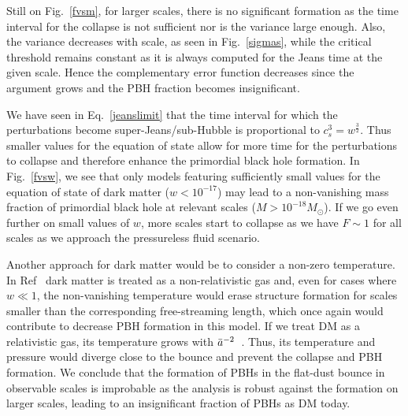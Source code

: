 \documentclass[a4paper,11pt]{article}
\begin{document}
Still on Fig.~\ref{fvsm}, for larger scales, there is no significant formation as the
time interval for the collapse is not sufficient nor is the variance large enough. Also,
the variance decreases with scale, as seen in Fig.~\ref{sigmas}, while the critical
threshold remains constant as it is always computed for the Jeans time at the given
scale. Hence the complementary error function decreases since the argument grows and the
PBH fraction becomes insignificant.

We have seen in Eq.~\eqref{jeanslimit} that the time interval for which the
perturbations become super-Jeans/sub-Hubble is proportional to $c_s^3 =
	w^{\frac{3}{2}}$. Thus smaller values for the equation of state allow for more time for
the perturbations to collapse and therefore enhance the primordial black hole formation.
In Fig.~\ref{fvsw}, we see that only models featuring sufficiently small values for the
equation of state of dark matter ($w < 10^{-17}$) may lead to a non-vanishing mass
fraction of primordial black hole at relevant scales ($M >  10^{-18}M_\odot$). If we go
even further on small values of $w$, more scales start to collapse as we have $F\sim 1$
for all scales as we approach the pressureless fluid scenario.

Another approach for dark matter would be to consider a non-zero temperature. In
Ref~\cite{Armendariz2014} dark matter is treated as a non-relativistic gas and, even for
cases where $w\ll1$, the non-vanishing temperature would erase structure formation for
scales smaller than the corresponding free-streaming length, which once again would
contribute to decrease PBH formation in this model. If we treat DM as a relativistic
gas, its temperature grows with $\Bar{a}^{-2}$~\cite{Mukhanov1992}. Thus, its
temperature and pressure would diverge close to the bounce and prevent the collapse and
PBH formation. We conclude that the formation of PBHs in the flat-dust bounce in
observable scales is improbable as the analysis is robust against the formation on
larger scales, leading to an insignificant fraction of PBHs as DM today.
\end{document}
